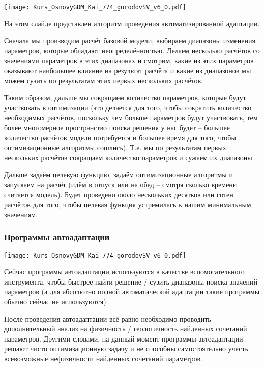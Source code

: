 \documentclass[main.tex]{subfiles}
\begin{document}
\texttt{[image: Kurs\_OsnovyGDM\_Kai\_774\_gorodovSV\_v6\_0.pdf]}

На этом слайде представлен алгоритм проведения автоматизированной адаптации.

Сначала мы производим расчёт базовой модели, выбираем диапазоны изменения параметров, которые обладают неопределённостью.
Делаем несколько расчётов со значениями параметров в этих диапазонах и смотрим, какие из этих параметров оказывают наибольшее влияние на результат расчёта и какие из диапазонов мы можем сузить по результатам этих первых нескольких расчётов.

Таким образом, дальше мы сокращаем количество параметров, которые будут участвовать в оптимизации (это делается для того, чтобы сократить количество необходимых расчётов, поскольку чем больше параметров будут участвовать, тем более многомерное пространство поиска решения у нас будет -- большее количество расчётов модели потребуется и большее время для того, чтобы оптимизационные алгоритмы сошлись).
Т.е. мы по результатам первых нескольких расчётов сокращаем количество параметров и сужаем их диапазоны.

Дальше задаём целевую функцию, задаём оптимизационные алгоритмы и запускаем на расчёт (идём в отпуск или на обед -- смотря сколько времени считается модель).
Будет проведено около нескольких десятков или сотен расчётов для того, чтобы целевая функция устремилась к нашим минимальным значениям.

\subsubsection{Программы автоадаптации}

\texttt{[image: Kurs\_OsnovyGDM\_Kai\_774\_gorodovSV\_v6\_0.pdf]}

Сейчас программы автоадаптации используются в качестве вспомогательного инструмента, чтобы быстрее найти решение / сузить диапазоны поиска значений параметров (а для абсолютно полной автоматической адаптации такие программы обычно сейчас не используются).

После проведения автоадаптации всё равно необходимо проводить дополнительный анализ на физичность / геологичность найденных сочетаний параметров.
Другими словами, на данный момент программы автоадаптации решают чисто оптимизационную задачу и не способны самостоятельно учесть всевозможные нефизичности найденных сочетаний параметров.
\\
\end{document}
